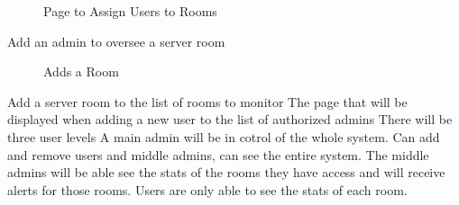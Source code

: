 \documentclass{report}
\begin{document}
%
\begin{figure}[H]
\caption{Page to Assign Users to Rooms}
\end{figure}
Add an admin to oversee a server room
\newpage

\begin{figure}[H]
\caption{Adds a Room}
\end{figure}
Add a server room to the list of rooms to monitor
\newpage
The page that will be displayed when adding a new user to the list of authorized admins
\newline
There will be three user levels
A main admin will be in cotrol of the whole system. Can add and remove users and middle admins, can see the entire system.
\newline
The middle admins will be able see the stats of the rooms they have access and will receive alerts for those rooms.
\newline
Users are only able to see the stats of each room. 
\end{document}

